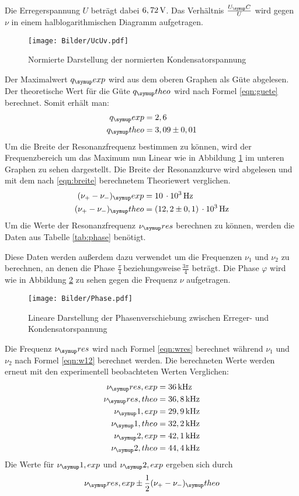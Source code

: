 
\\
Die Erregerspannung $U$ beträgt dabei $6,72 \,\si{\volt}$.
Das Verhältnis $\frac{U_\su{C}}{U}$ wird gegen $\nu$ in einem halblogarithmischen
Diagramm aufgetragen.
\begin{figure}[h]
  \centering
  \texttt{[image: Bilder/UcUv.pdf]}
  \caption{Normierte Darstellung der normierten Kondensatorspannung}
  \label{fig:UcUv}
\end{figure}
Der Maximalwert $q_\su{exp}$ wird aus dem oberen Graphen als Güte abgelesen. Der
theoretische Wert für die Güte $q_\su{theo}$ wird nach Formel \eqref{eqn:guete} berechnet.
Somit erhält man:
\begin{align*}
  q_\su{exp} &= 2,6 \\
  q_\su{theo} &= 3,09 \pm 0,01
\end{align*}
Um die Breite der Resonanzfrequenz bestimmen zu können, wird der Frequenzbereich
um das Maximum nun Linear wie in Abbildung \ref{fig:UcUv} im unteren Graphen
zu sehen dargestellt. Die Breite der Resonanzkurve wird abgelesen und mit dem
nach \eqref{eqn:breite} berechnetem Theoriewert verglichen.
\begin{align*}
  (\nu_+ - \nu_-)_\su{exp} &= 10\,\cdot10^3\Hz \\
  (\nu_+ - \nu_-)_\su{theo}&= (12,2 \pm 0,1)\,\cdot 10^3\Hz %
\end{align*}
Um die Werte der Resonanzfrequenz $\nu_\su{res}$ berechnen zu können, werden
die Daten aus Tabelle \ref{tab:phase} benötigt.

Diese Daten werden außerdem dazu verwendet um die Frequenzen $\nu_1$ und
$\nu_2$ zu berechnen, an denen die Phase $\frac{\pi}{4}\,\text{beziehungsweise}\,
\frac{3\pi}{4}$ beträgt. Die Phase $\varphi$ wird wie in Abbildung \ref{fig:phse}
zu sehen gegen die Frequenz $\nu$ aufgetragen.
\begin{figure}[h]
  \centering
  \texttt{[image: Bilder/Phase.pdf]}
  \caption{Lineare Darstellung der Phasenverschiebung zwischen Erreger- und
  Kondensatorspannung}
  \label{fig:phse}
\end{figure}
Die Frequenz $\nu_\su{res}$ wird nach Formel \eqref{eqn:wres} berechnet
während $\nu_1$ und $\nu_2$ nach Formel \eqref{eqn:w12} berechnet werden.
Die berechneten Werte werden erneut mit den experimentell beobachteten Werten
Verglichen:
\begin{align*}
  \nu_\su{res,exp} &= 36\kHz \\
  \nu_\su{res,theo}&= 36,8 \kHz \\
  \nu_\su{1,exp} &= 29,9\kHz \\
  \nu_\su{1,theo}&=32,2\kHz \\
  \nu_\su{2,exp} &= 42,1 \kHz \\
  \nu_\su{2,theo}&= 44,4\kHz
\end{align*}
Die Werte für $\nu_\su{1,exp}$ und $\nu_\su{2,exp}$ ergeben sich durch
\begin{equation*}
  \nu_\su{res,exp} \pm \frac{1}{2}(\nu_+ - \nu_-)_\su{theo}
\end{equation*}
